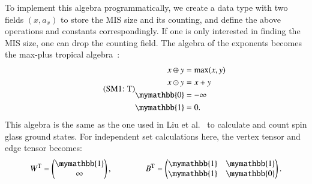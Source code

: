\documentclass[onefignum, onetabnum]{siamart190516}
\newcommand{\eqname}[1]{\stepcounter{equation}\tag{\theequation : #1}}
\newcommand{\<}{\langle}
\renewcommand{\>}{\rangle}
\begin{document}
To implement this algebra programmatically, we create a data type with two fields $(x, a_x)$ to store the MIS size and its counting,
and define the above operations and constants correspondingly.
If one is only interested in finding the MIS size, one can drop the counting field.
The algebra of the exponents becomes the max-plus tropical algebra~\cite{Maclagan2015, Moore2011}:
\begin{equation}\eqname{T}
    \begin{split}
        x \oplus y &= \max(x,y)\\
        x \odot y &= x + y\\
        \mymathbb{0} &= -\infty\\
        \mymathbb{1} &= 0.
    \end{split}\label{eq:tropical}
\end{equation}
This algebra is the same as the one used in Liu et al.~\cite{Liu2021} to calculate and count spin glass ground states.
For independent set calculations here, the vertex tensor and edge tensor becomes:
\begin{equation}
    W^{\rm T} = \left(\begin{matrix}
        \mymathbb{1} \\
        \infty
    \end{matrix}\right),   
    \qquad \qquad
        B^{\rm T} = \left(\begin{matrix}
        \mymathbb{1}  & \mymathbb{1} \\
        \mymathbb{1} & \mymathbb{0}
    \end{matrix}\right).
\end{equation}
\end{document}
